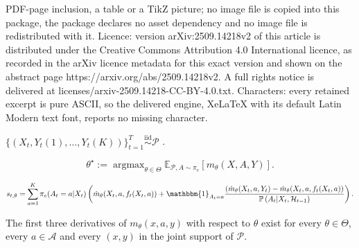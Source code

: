 \documentclass[10pt,a4paper]{amsart}
\DeclareMathOperator*{\argmax}{argmax}
\newcommand{\R}{\mathbb{R}}
\begin{document}
PDF-page inclusion, a table or a TikZ picture; no image file is copied into this package, the package declares no asset dependency and no image file is redistributed with it. Licence: version arXiv:2509.14218v2 of this article is distributed under the Creative Commons Attribution 4.0 International licence, as recorded in the arXiv licence metadata for this exact version and shown on the abstract page https://arxiv.org/abs/2509.14218v2. A full rights notice is delivered at licenses/arxiv-2509.14218-CC-BY-4.0.txt. Characters: every retained excerpt is pure ASCII, so the delivered engine, XeLaTeX with its default Latin Modern text font, reports no missing character.
\begin{assumption} \label{assumption:potential_outcomes}
$\{(X_{t}, Y_{t}(1), \ldots, Y_t(K))\}_{t=1}^{T} \overset{\mathrm{iid}}{\sim}  \mathcal{P}$ .
\end{assumption}

\begin{equation} \label{eqn:theta_star}
\theta^{\star} := \argmax_{\theta \in \Theta} \mathbb{E}_{\mathcal{P}, A\sim\pi_{e}}\left[ m_{\theta}(X,A,Y) \right].
\end{equation}

\begin{equation} \label{eqn:score}
s_{t,\theta} = \sum_{a=1}^{K} \pi_{e}(A_{t} =a | X_{t}) \left( \dot{m}_{\theta}(X_{t},a,f_{t}(X_{t},a))   + \mathbbm{1}_{A_{t}=a}\frac{ \left( \dot{m}_{\theta}(X_{t},a,Y_{t})  -  \dot{m}_{\theta}(X_{t},a,f_{t}(X_{t},a) \right)}{ \mathbb{P} \left(A_{t}| X_{t}, \mathcal{H}_{t-1} \right)  }\right).
\end{equation}

\begin{assumption} \label{assumption:differentiability}
The first three derivatives of $m_{\theta}(x,a,y)$ with respect to $\theta$ exist for every $\theta \in \Theta$, every $a \in \mathcal{A}$ and every $(x,y)$ in the joint support of $\mathcal{P}$.
\end{assumption}
\end{document}

